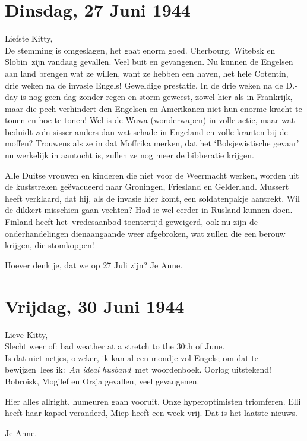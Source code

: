 \documentclass{book}
\begin{document}
\section*{Dinsdag, 27 Juni 1944}

Liefste Kitty,\\
De stemming is omgeslagen, het gaat enorm goed.  Cherbourg,
Witebsk en Slobin~zijn vandaag gevallen. Veel buit en gevangenen. Nu kunnen de
Engelsen aan land brengen wat ze willen, want ze hebben een haven, het hele
Cotentin, drie weken na de invasie Engels!  Geweldige prestatie. In de drie
weken na de D.-day is nog geen dag zonder regen en storm geweest, zowel hier als
in Frankrijk, maar die pech verhindert den Engelsen en Amerikanen niet hun
enorme kracht te tonen en hoe te tonen! Wel is de Wuwa (wonderwapen) in volle
actie, maar wat beduidt zo'n sisser anders dan wat schade in Engeland en volle
kranten bij de moffen? Trouwens als ze in dat Moffrika merken, dat het
`Bolsjewistische gevaar' nu werkelijk in aantocht is, zullen ze nog meer de
bibberatie krijgen.

Alle Duitse vrouwen en kinderen die niet voor de Weermacht werken, worden uit de
kuststreken geëvacueerd naar Groningen, Friesland en Gelderland. Mussert heeft
verklaard, dat hij, als de invasie hier komt, een soldatenpakje aantrekt. Wil de
dikkert misschien gaan vechten? Had ie wel eerder in Rusland kunnen doen.
Finland heeft het~vredesaanbod toentertijd geweigerd, ook nu zijn de
onderhandelingen dienaangaande weer afgebroken, wat zullen die een berouw
krijgen, die stomkoppen!

Hoever denk je, dat we op 27 Juli zijn? Je Anne.

\section*{Vrijdag, 30 Juni 1944}

Lieve Kitty,\\
Slecht weer of: bad weather at a stretch to the 30th of June.\\
Is dat niet netjes, o zeker, ik kan al een mondje vol Engels; om dat te
bewijzen~lees ik:~\emph{An ideal husband}~met woordenboek. Oorlog uitstekend!
Bobroisk, Mogilef en Orsja gevallen, veel gevangenen.

Hier alles allright, humeuren gaan vooruit. Onze hyperoptimisten triomferen.
Elli heeft haar kapsel veranderd, Miep heeft een week vrij.  Dat is het laatste
nieuws.

Je Anne.
\end{document}
